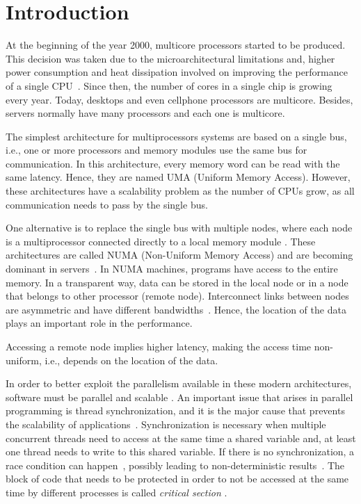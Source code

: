 \chapter{Introduction}

At the beginning of the year 2000, multicore processors started to be produced. This decision was taken due to the microarchitectural limitations and, higher power consumption and heat dissipation involved on improving the performance of a single CPU~\cite{Trono:2015}. Since then, the number of cores in a single chip is growing every year. Today, desktops and even cellphone processors are multicore. Besides, servers normally have many processors and each one is multicore. 

The simplest architecture for multiprocessors systems are based on a single bus, i.e., one or more processors and memory modules use the same bus for communication. In this architecture, every memory word can be read with the same latency. Hence, they are named UMA (Uniform Memory Access). However, these architectures have a scalability problem as the number of CPUs grow, as all communication needs to pass by the single bus.

One alternative is to replace the single bus with multiple nodes, where each node is a multiprocessor connected directly to a local memory module \cite{Gaud:2015}. These architectures are called NUMA (Non-Uniform Memory Access) and are becoming dominant in servers~\cite{Calciu:2017}. In NUMA machines, programs have access to the entire memory. In a transparent way, data can be stored in the local node or in a node that belongs to other processor (remote node). Interconnect links between nodes are asymmetric and have different bandwidths~\cite{Lepers:2015}. Hence, the location of the data plays an important role in the performance.


Accessing a remote node implies higher latency, making the access time non-uniform, i.e., depends on the location of the data. 

In order to better exploit the parallelism available in these modern architectures,  software must be parallel and scalable \cite{Grahn:2010}. An important issue that arises in parallel programming is thread synchronization, and it is the major cause that prevents the scalability of applications~\cite{David:2013}. Synchronization is necessary when multiple concurrent threads need to access at the same time a shared variable and, at least one thread needs to write to this shared variable. If there is no synchronization, a race condition can happen~\cite{Netzer:1992}, possibly leading to non-deterministic results~\cite{Trono:2015}. The block of code that needs to be protected in order to not be accessed at the same time by different processes is called \emph{critical section} \cite{Raynal:2013}. 

